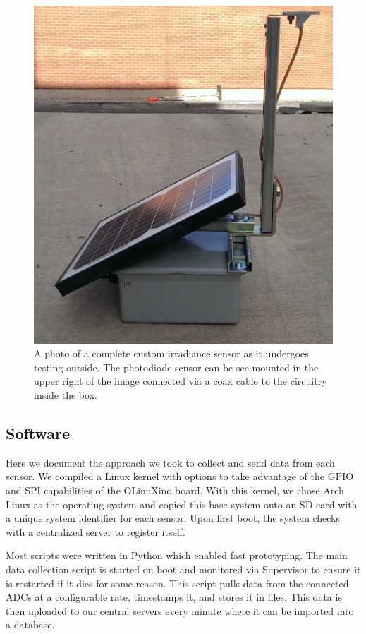 \begin{figure}[p]
  \includegraphics[width=\textwidth]{figs/sensor_outside.jpg}
\caption[A complete custom sensor]{A photo of a complete custom
  irradiance sensor as it undergoes testing outside. The photodiode
  sensor can be see mounted in the upper right of the image connected
  via a coax cable to the circuitry inside the box.}
\label{fig:sensor_outside}
\end{figure}

\subsection{Software}
Here we document the approach we took to collect and send data from
each sensor.
We compiled a Linux kernel with options to take advantage of
the GPIO and SPI capabilities of the OLinuXino board.
With this kernel, we chose Arch Linux as the operating system and
copied this base system onto an SD card with a unique system
identifier for each sensor.
Upon first boot, the system checks with a centralized server to
register itself.

Most scripts were written in Python which enabled fast prototyping.
The main data collection script is started on boot and monitored via
Supervisor to ensure it is restarted if it dies for some reason.
This script pulls data from the connected ADCs at a configurable rate,
timestamps it, and stores it in files.
This data is then uploaded to our central servers every minute where
it can be imported into a database.

